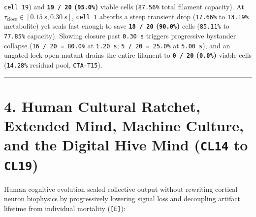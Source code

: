 \documentclass[10pt,letterpaper]{article}
\begin{document}
\begin{enumerate}
  \texttt{cell\ 19}) and \textbf{\texttt{19\ /\ 20} (\texttt{95.0\%})}
  viable cells (\texttt{87.56\%} total filament capacity). At
  \(\tau_{\text{close}} \in [0.15\;\text{s}, 0.30\;\text{s}]\),
  \texttt{cell\ 1} absorbs a steep transient drop (\texttt{17.66\%} to
  \texttt{13.19\%} metabolite) yet seals fast enough to save
  \textbf{\texttt{18\ /\ 20} (\texttt{90.0\%})} cells (\texttt{85.11\%}
  to \texttt{77.85\%} capacity). Slowing closure past \texttt{0.30\ s}
  triggers progressive bystander collapse (\texttt{16\ /\allowbreak{}\ 20\ =\ 80.\allowbreak{}0\%}
  at \texttt{1.20\ s}; \texttt{5\ /\allowbreak{}\ 20\ =\ 25.\allowbreak{}0\%} at
  \texttt{5.00\ s}), and an ungated lock-open mutant drains the entire
  filament to \textbf{\texttt{0\ /\ 20} (\texttt{0.0\%})} viable cells
  (\texttt{14.28\%} residual pool, \texttt{CTA-T15}).
\end{enumerate}

\begin{center}\rule{0.5\linewidth}{0.5pt}\end{center}

\section{\texorpdfstring{4. Human Cultural Ratchet, Extended Mind,
Machine Culture, and the Digital Hive Mind (\texttt{CL14} to
\texttt{CL19})}{4. Human Cultural Ratchet, Extended Mind, Machine Culture, and the Digital Hive Mind (CL14 to CL19)}}\label{human-cultural-ratchet-extended-mind-machine-culture-and-the-digital-hive-mind-cl14-to-cl19}

Human cognitive evolution scaled collective output without rewriting
cortical neuron biophysics by progressively lowering signal loss and
decoupling artifact lifetime from individual mortality
(\texttt{{[}E{]}}):
\end{document}
